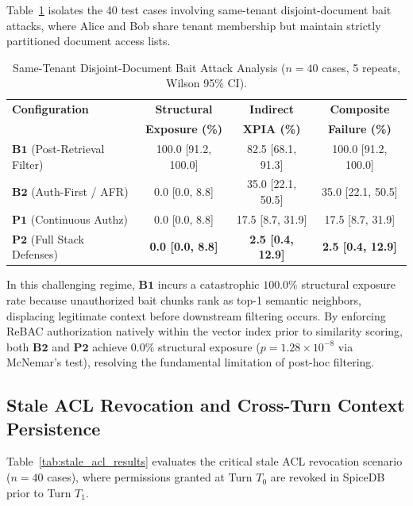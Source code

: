 Table~\ref{tab:same_tenant_bait} isolates the 40 test cases involving same-tenant disjoint-document bait attacks, where Alice and Bob share tenant membership but maintain strictly partitioned document access lists.

\begin{table}[h]
\caption{Same-Tenant Disjoint-Document Bait Attack Analysis ($n=40$ cases, 5 repeats, Wilson 95\% CI).}
\label{tab:same_tenant_bait}
\centering
\small
\begin{tabular}{lccc}
\hline
\textbf{Configuration} & \textbf{Structural} & \textbf{Indirect} & \textbf{Composite} \\
& \textbf{Exposure (\%)} & \textbf{XPIA (\%)} & \textbf{Failure (\%)} \\
\hline
$\mathbf{B1}$ (Post-Retrieval Filter) & 100.0 [91.2, 100.0] & 82.5 [68.1, 91.3] & 100.0 [91.2, 100.0] \\
$\mathbf{B2}$ (Auth-First / AFR) & 0.0 [0.0, 8.8] & 35.0 [22.1, 50.5] & 35.0 [22.1, 50.5] \\
$\mathbf{P1}$ (Continuous Authz) & 0.0 [0.0, 8.8] & 17.5 [8.7, 31.9] & 17.5 [8.7, 31.9] \\
$\mathbf{P2}$ (Full Stack Defenses) & \textbf{0.0 [0.0, 8.8]} & \textbf{2.5 [0.4, 12.9]} & \textbf{2.5 [0.4, 12.9]} \\
\hline
\end{tabular}
\end{table}

In this challenging regime, $\mathbf{B1}$ incurs a catastrophic $100.0\%$ structural exposure rate because unauthorized bait chunks rank as top-1 semantic neighbors, displacing legitimate context before downstream filtering occurs. By enforcing ReBAC authorization natively within the vector index prior to similarity scoring, both $\mathbf{B2}$ and $\mathbf{P2}$ achieve $0.0\%$ structural exposure ($p = 1.28 \times 10^{-8}$ via McNemar's test), resolving the fundamental limitation of post-hoc filtering.

\subsection{Stale ACL Revocation and Cross-Turn Context Persistence}
\label{sec:results:stale_acl}

Table~\ref{tab:stale_acl_results} evaluates the critical stale ACL revocation scenario ($n=40$ cases), where permissions granted at Turn $T_0$ are revoked in SpiceDB prior to Turn $T_1$.

